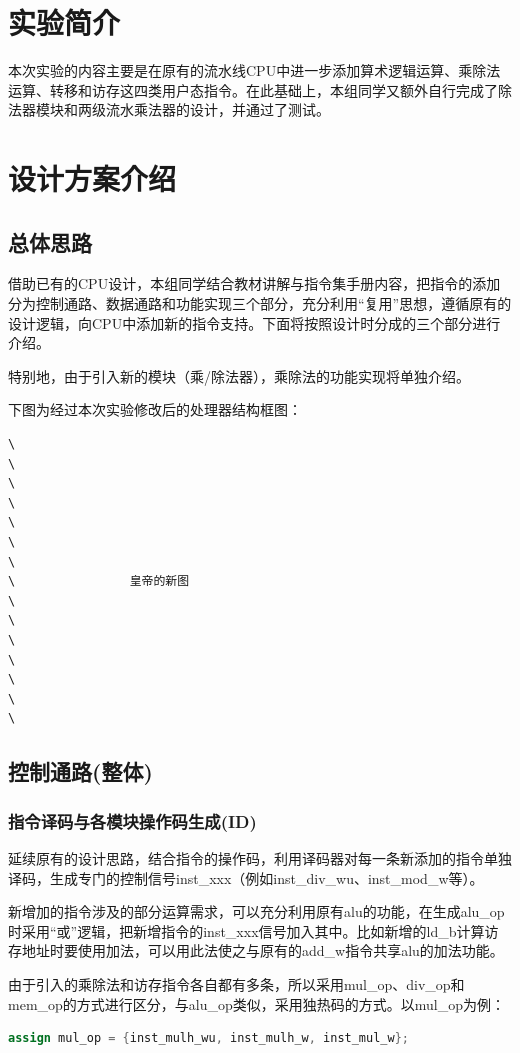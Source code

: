 \documentclass[11pt]{article}
\begin{document}


\section{实验简介}
本次实验的内容主要是在原有的流水线CPU中进一步添加算术逻辑运算、乘除法运算、转移和访存这四类用户态指令。在此基础上，本组同学又额外自行完成了除法器模块和两级流水乘法器的设计，并通过了测试。

\section{设计方案介绍}
\subsection{总体思路}
借助已有的CPU设计，本组同学结合教材讲解与指令集手册内容，把指令的添加分为控制通路、数据通路和功能实现三个部分，充分利用“复用”思想，遵循原有的设计逻辑，向CPU中添加新的指令支持。下面将按照设计时分成的三个部分进行介绍。

特别地，由于引入新的模块（乘/除法器），乘除法的功能实现将单独介绍。

下图为经过本次实验修改后的处理器结构框图：
\begin{lstlisting}
\
\
\
\
\       
\
\
\                皇帝的新图
\
\
\
\
\
\
\
\end{lstlisting}
\subsection{控制通路(整体)}

\subsubsection{指令译码与各模块操作码生成(ID)}

延续原有的设计思路，结合指令的操作码，利用译码器对每一条新添加的指令单独译码，生成专门的控制信号inst_xxx（例如inst_div_wu、inst_mod_w等）。

新增加的指令涉及的部分运算需求，可以充分利用原有alu的功能，在生成alu_op时采用“或”逻辑，把新增指令的inst_xxx信号加入其中。比如新增的ld_b计算访存地址时要使用加法，可以用此法使之与原有的add_w指令共享alu的加法功能。

由于引入的乘除法和访存指令各自都有多条，所以采用mul_op、div_op和mem_op的方式进行区分，与alu_op类似，采用独热码的方式。以mul_op为例：
\begin{lstlisting}[language=Verilog, caption={mul_op(独热码)}]
assign mul_op = {inst_mulh_wu, inst_mulh_w, inst_mul_w};
\end{lstlisting}
\end{document}
